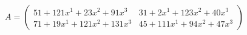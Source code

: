 \documentclass[preview]{standalone}
\begin{document}
\begin{align*}
A = \begin{pmatrix}51 + 121x^{1} + 23x^{2} + 91x^{3} & 31 + 2x^{1} + 123x^{2} + 40x^{3} \\ 71 + 19x^{1} + 121x^{2} + 131x^{3} & 45 + 111x^{1} + 94x^{2} + 47x^{3}\end{pmatrix}
\end{align*}
\end{document}

